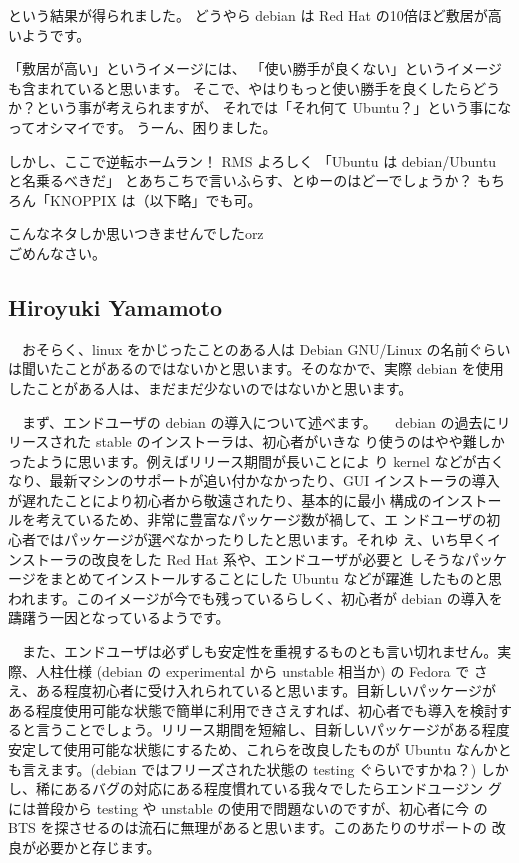 \documentclass[mingoth,a4paper]{jsarticle}
\begin{document}
という結果が得られました。
どうやら debian は Red Hat の10倍ほど敷居が高いようです。

「敷居が高い」というイメージには、
「使い勝手が良くない」というイメージも含まれていると思います。
そこで、やはりもっと使い勝手を良くしたらどうか？という事が考えられますが、
それでは「それ何て Ubuntu？」という事になってオシマイです。
うーん、困りました。

しかし、ここで逆転ホームラン！
RMS よろしく
「Ubuntu は debian/Ubuntu と名乗るべきだ」
とあちこちで言いふらす、とゆーのはどーでしょうか？
もちろん「KNOPPIX は（以下略」でも可。

こんなネタしか思いつきませんでしたorz\\
ごめんなさい。

\subsection{Hiroyuki Yamamoto}

　おそらく、linux をかじったことのある人は Debian GNU/Linux の名前ぐらい
は聞いたことがあるのではないかと思います。そのなかで、実際 debian を使用
したことがある人は、まだまだ少ないのではないかと思います。

　まず、エンドユーザの debian の導入について述べます。
　debian の過去にリリースされた stable のインストーラは、初心者がいきな
り使うのはやや難しかったように思います。例えばリリース期間が長いことによ
り kernel などが古くなり、最新マシンのサポートが追い付かなかったり、GUI
インストーラの導入が遅れたことにより初心者から敬遠されたり、基本的に最小
構成のインストールを考えているため、非常に豊富なパッケージ数が禍して、エ
ンドユーザの初心者ではパッケージが選べなかったりしたと思います。それゆ
え、いち早くインストーラの改良をした Red Hat 系や、エンドユーザが必要と
しそうなパッケージをまとめてインストールすることにした Ubuntu などが躍進
したものと思われます。このイメージが今でも残っているらしく、初心者が
debian の導入を躊躇う一因となっているようです。

　また、エンドユーザは必ずしも安定性を重視するものとも言い切れません。実
際、人柱仕様 (debian の experimental から unstable 相当か) の Fedora で
さえ、ある程度初心者に受け入れられていると思います。目新しいパッケージが
ある程度使用可能な状態で簡単に利用できさえすれば、初心者でも導入を検討す
ると言うことでしょう。リリース期間を短縮し、目新しいパッケージがある程度
安定して使用可能な状態にするため、これらを改良したものが Ubuntu なんかと
も言えます。(debian ではフリーズされた状態の testing ぐらいですかね？)
しかし、稀にあるバグの対応にある程度慣れている我々でしたらエンドユージン
グには普段から testing や unstable の使用で問題ないのですが、初心者に今
の BTS を探させるのは流石に無理があると思います。このあたりのサポートの
改良が必要かと存じます。
\end{document}
